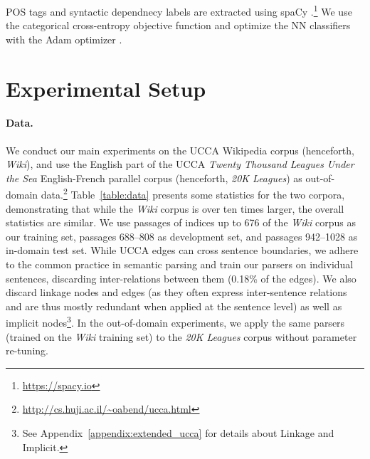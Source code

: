 \documentclass[11pt,a4paper]{article}
\newcommand{\tabref}[1]{Table~\ref{#1}}
\begin{document}
POS tags and syntactic dependnecy labels are extracted using spaCy
\cite{honnibal-johnson:2015:EMNLP}.\footnote{\url{https://spacy.io}}
We use the categorical cross-entropy objective function and optimize the
NN classifiers with the Adam optimizer \cite{kingma2014adam}.

\section{Experimental Setup}\label{sec:exp_setup}

\paragraph{Data.}
We conduct our main experiments on the UCCA Wikipedia corpus (henceforth, \textit{Wiki}),
and use the English part of the UCCA \textit{Twenty Thousand Leagues Under the Sea}
English-French parallel corpus (henceforth, \textit{20K Leagues}) as
out-of-domain data.\footnote{\mbox{\url{http://cs.huji.ac.il/~oabend/ucca.html}}}
\tabref{table:data} presents some statistics for the two corpora, demonstrating that while
the \textit{Wiki} corpus is over ten times larger, the overall statistics are
similar.
We use passages of indices up to 676
of the \textit{Wiki} corpus as our training set, passages 688--808 as development set,
and passages 942--1028 as in-domain test set.
While UCCA edges can cross sentence boundaries, we adhere to the common
practice in semantic parsing and train our parsers on individual sentences,
discarding inter-relations between them (0.18\% of the edges).
We also discard linkage nodes and edges (as they often express inter-sentence
relations and are thus mostly redundant when applied at the sentence level)
as well as implicit nodes\footnote{See Appendix~\ref{appendix:extended_ucca}
for details about Linkage and Implicit.}.
In the out-of-domain experiments, we apply the same parsers
(trained on the \textit{Wiki} training set) to the \textit{20K Leagues} corpus
without parameter re-tuning.
\end{document}
